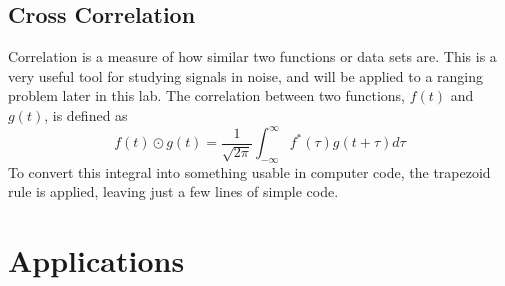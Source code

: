 \documentclass[12pt]{article}
\begin{document}
\subsection{Cross Correlation}
Correlation is a measure of how similar two functions or data sets are.  This is a very useful tool for studying signals in noise, and will be applied to a ranging problem later in this lab.  The correlation between two functions, $f(t)$ and $g(t)$, is defined as
\begin{equation}
\label{correl}
f(t) \odot g(t) = \frac{1}{\sqrt{2\pi}} \int_{-\infty}^\infty f^*(\tau)g(t+\tau)d\tau
\end{equation}
To convert this integral into something usable in computer code, the trapezoid rule is applied, leaving just a few lines of simple code.

\section{Applications}
\end{document}
